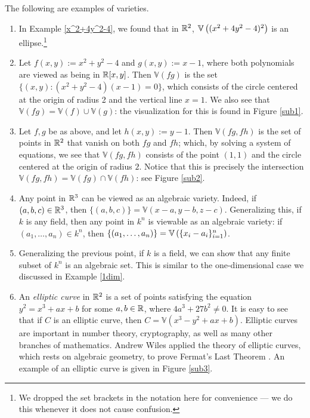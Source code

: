 \documentclass{article}
\newcommand{\V}{\mathbb V}
\begin{document}
\begin{example}\label{algvarexamples}
The following are examples of varieties.
\begin{enumerate}
\item In Example \ref{x^2+4y^2-4}, we found that in $\mathbb R^2$, $\V\paren{(x^2+4y^2-4)^2}$ is an ellipse.\footnote{We dropped the set brackets in the notation here for convenience --- we do this whenever it does not cause confusion.}
\item Let $f(x,y) := x^2+y^2-4$ and $g(x,y) := x-1$, where both polynomials are viewed as being in $\mathbb R[x,y]$. Then $\V(fg)$ is the set $\{(x,y): (x^2+y^2-4)(x-1) = 0\}$, which consists of the circle centered at the origin of radius 2 and the vertical line $x=1$. We also see that $\V(fg) = \V(f)\cup \V(g)$: the visualization for this is found in Figure \ref{sub1}.
\item Let $f,g$ be as above, and let $h(x,y) := y-1$. Then $\V(fg, fh)$ is the set of points in $\mathbb R^2$ that vanish on both $fg$ and $fh$; which, by solving a system of equations, we see that $\V(fg, fh)$ consists of the point $(1,1)$ and the circle centered at the origin of radius $2$. Notice that this is precisely the intersection $\V(fg,fh) = \V(fg) \cap \V(fh)$: see Figure \ref{sub2}.
\item Any point in $\mathbb R^3$ can be viewed as an algebraic variety. Indeed, if $(a,b,c)\in \mathbb R^3$, then $\{(a,b,c)\} = \V(x-a, y-b, z-c)$. Generalizing this, if $k$ is any field, then any point in $k^n$ is viewable as an algebraic variety: if $(a_1, \ldots, a_n) \in k^n$, then $\{(a_1,\ldots, a_n)\} = \V\paren{\{x_i-a_i\}_{i=1}^n}$.
\item Generalizing the previous point, if $k$ is a field, we can show that any finite subset of $k^n$ is an algebraic set. This is similar to the one-dimensional case we discussed in Example \ref{1dim}.
\item An \textit{elliptic curve} in $\mathbb R^2$ is a set of points satisfying the equation $y^2=x^3+ax+b$ for some $a,b\in\mathbb R$, where $4a^3+27b^2\neq 0$. It is easy to see that if $C$ is an elliptic curve, then $C = \V(x^3-y^2 + ax +b)$. Elliptic curves are important in number theory, cryptography, as well as many other branches of mathematics. Andrew Wiles applied the theory of elliptic curves, which rests on algebraic geometry, to prove Fermat's Last Theorem \cite{smith}. An example of an elliptic curve is given in Figure \ref{sub3}.
\end{enumerate}
\end{example}
\end{document}
